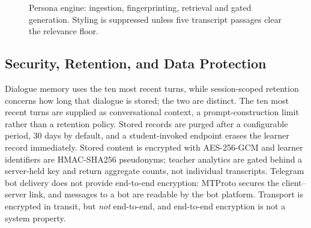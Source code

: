 \documentclass[conference]{IEEEtran}
\begin{document}
\begin{figure}[!t]
\centering
{}
\caption{Persona engine: ingestion, fingerprinting, retrieval and gated
generation. Styling is suppressed unless five transcript passages clear the
relevance floor.}
\label{fig:persona}
\end{figure}

\subsection{Security, Retention, and Data Protection}
Dialogue memory uses the ten most recent turns, while session-scoped retention
concerns how long that dialogue is stored; the two are distinct. The ten most
recent turns are supplied as conversational context, a prompt-construction
limit rather than a retention policy. Stored records are purged after a
configurable period, $30$ days by default, and a student-invoked endpoint
erases the learner record immediately. Stored content is encrypted with
AES-256-GCM and learner identifiers are HMAC-SHA256 pseudonyms; teacher
analytics are gated behind a server-held key and return aggregate counts, not
individual transcripts. Telegram bot delivery does not provide end-to-end
encryption: MTProto secures the client--server link, and messages to a bot are
readable by the bot platform. Transport is encrypted in transit, but \emph{not}
end-to-end, and end-to-end encryption is not a system property.
\end{document}
